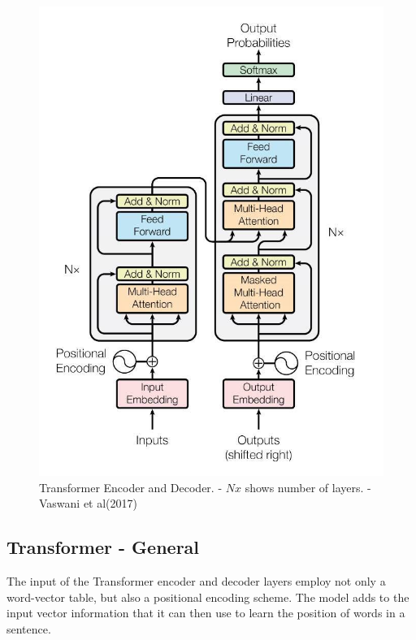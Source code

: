 \begin{figure}[H]
	\begin{center}
		
		
		\includegraphics[scale=2.0]{diagram-mat04}
	\end{center}
	\caption[Transformer Encoder and Decoder]{Transformer Encoder and Decoder. - $Nx$ shows number of layers. - Vaswani et al(2017)\cite{Vaswani2017AttentionIA}}
	

\end{figure}

\subsection*{Transformer - General}

The input of the Transformer encoder and decoder layers employ not only a word-vector table, but also a positional encoding scheme. The model adds to the input vector information that it can then use to learn the position of words in a sentence. 

